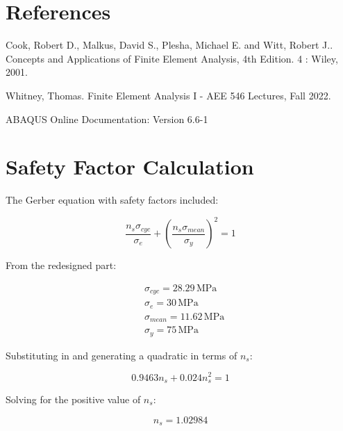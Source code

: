 \documentclass[../main.tex]{subfiles}
\begin{document}
	\begin{appendices}
		\section{References}
		\label{References}
		Cook, Robert D., Malkus, David S., Plesha, Michael E. and Witt, Robert J.. Concepts and Applications of Finite Element Analysis, 4th Edition. 4 : Wiley, 2001.

		Whitney, Thomas. Finite Element Analysis I - AEE 546 Lectures, Fall 2022.

		ABAQUS Online Documentation: Version 6.6-1

		\clearpage
		\section{Safety Factor Calculation}
		\label{safety}

		The Gerber equation with safety factors included:

		\[
			\frac{n_s \sigma_{cyc}}{\sigma_e} + \left({ \frac{n_s\sigma_{mean}}{\sigma_y}}\right)^2 = 1
		\]

		From the redesigned part:

		\begin{align*}
			&\sigma_{cyc} = 28.29 \,\unit{\mega\pascal}\\
			&\sigma_e = 30 \,\unit{\mega\pascal}\\
			&\sigma_{mean} = 11.62\,\unit{\mega\pascal}\\
			&\sigma_y = 75 \,\unit{\mega\pascal}
		\end{align*}

		Substituting in and generating a quadratic in terms of \(n_s\):

		\[
			0.9463 n_s + 0.024 n_s^2 = 1
		\]

		Solving for the positive value of \(n_s\):

		\[
			n_s = 1.02984	
		\]

	\end{appendices}
\end{document}
